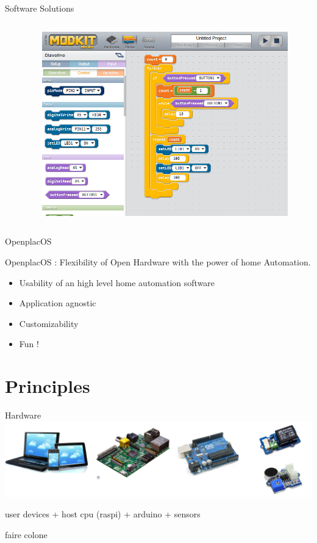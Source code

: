 \documentclass{beamer}
\begin{document}
\begin{frame}{Software Solutions}
\begin{columns}
\begin{column}[l]{0.5\textwidth}
\begin{itemize}
\end{itemize}
\end{column}
\begin{column}[r]{0.5\textwidth}
\begin{figure}
\includegraphics[width=0.9\columnwidth]{./figures/modkit.png}
\end{figure}
\end{column}
\end{columns}
\end{frame}

\begin{frame}{OpenplacOS}
\begin{block}{OpenplacOS : }
Flexibility of Open Hardware with the power of home Automation.
\begin{itemize}
\item[\Large\smiley] Usability of an high level home automation software
\item[\Large\smiley] Application agnostic 
\item[\Large\smiley] Customizability
\item[\Large\smiley] Fun !
\end{itemize}
\end{block}
\end{frame}

\section{Principles}
\begin{frame}{Hardware}
\includegraphics[width=1\columnwidth]{./figures/hardware.png}

user devices + host cpu (raspi) + arduino + sensors

faire colone
\end{frame}
\end{document}
